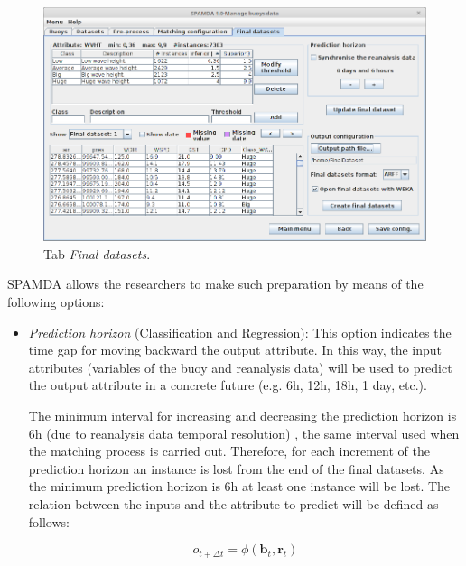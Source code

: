 \begin{onehalfspace}
				\begin{figure}[ht!]
					\centering
					\includegraphics[scale=0.40]{figures/tabFinalDatasets.png}
					\caption{Tab \textit{Final datasets}.}
					\label{fig:tabFinalDatasets}
				\end{figure}
				
				SPAMDA allows the researchers to make such preparation by means of the following options:
				
					\begin{itemize}
						\item \textit{Prediction horizon} (Classification and Regression): This option indicates the time gap for moving backward the output attribute. In this way, the input attributes (variables of the buoy and reanalysis data) will be used to predict the output attribute in a concrete future (e.g. 6h, 12h, 18h, 1 day, etc.).
						
						The minimum interval for increasing and decreasing the prediction horizon is $6$h (due to reanalysis data temporal resolution) \cite{DORADOMORENO2017428}, the same interval used when the matching process is carried out. Therefore, for each increment of the prediction horizon an instance is lost from the end of the final datasets. As the minimum prediction horizon is $6$h at least one instance will be lost. The relation between the inputs and the attribute to predict will be defined as follows:
						
						\begin{linenomath*}
								\begin{equation}
									o_{t+\Delta t}=\phi(\mathbf{b}_t,\mathbf{r}_{t})
								\end{equation}
							\end{linenomath*}
						

\end{itemize}
\end{onehalfspace}
